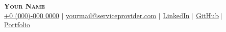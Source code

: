 

\begin{center}
    \textbf{\Huge \scshape Your Name} \\ \vspace{3pt}
        \small
    \faMobile \hspace{.5pt} \href{tel:0000000000}{+0 (000)-000 0000}
        $|$
    \faAt \hspace{.5pt} \href{mailto:yourmail@serviceprovider.com}{yourmail@serviceprovider.com}
        $|$
    \faLinkedinSquare \hspace{.5pt} \href{https://www.google.com}{LinkedIn}
        $|$
    \faGithub \hspace{.5pt} \href{https://www.google.com}{GitHub}
        $|$
        \faGlobe \hspace{.5pt} \href{https://www.google.com}{Portfolio}
\end{center}
